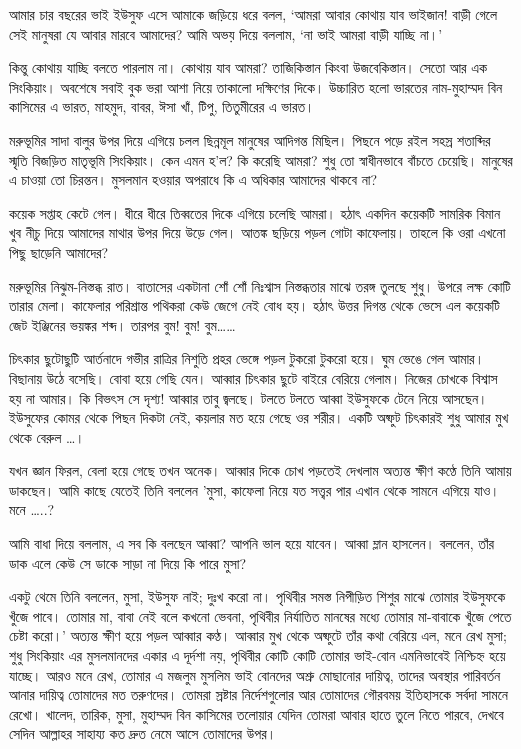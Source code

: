 \documentclass[
]{book}
\begin{document}
আমার চার বছরের ভাই ইউসুফ এসে আমাকে জড়িয়ে ধরে বলল, `আমরা আবার কোথায় যাব ভাইজান! বাড়ী গেলে সেই মানুষরা যে আবার মারবে আমাদের? আমি অভয় দিয়ে বললাম, `না ভাই আমরা বাড়ী যাচ্ছি না।'

কিন্তু কোথায় যাচ্ছি বলতে পারলাম না। কোথায় যাব আমরা? তাজিকিস্তান কিংবা উজবেকিস্তান। সেতো আর এক সিংকিয়াং। অবশেষে সবাই বুক ভরা আশা নিয়ে তাকালো দক্ষিণের দিকে। উচ্চারিত হলো ভারতের নাম-মুহাম্মদ বিন কাসিমের এ ভারত, মাহমুদ, বাবর, ঈসা খাঁ, টিপু, তিতুমীরের এ ভারত।

মরুভূমির সাদা বালুর উপর দিয়ে এগিয়ে চলল ছিন্নমূল মানুষের আদিগন্ত মিছিল। পিছনে পড়ে রইল সহস্র শতাব্দির স্মৃতি বিজড়িত মাতৃভূমি সিংকিয়াং। কেন এমন হ'ল? কি করেছি আমরা? শুধু তো স্বাধীনভাবে বাঁচতে চেয়েছি। মানুষের এ চাওয়া তো চিরন্তন। মুসলমান হওয়ার অপরাধে কি এ অধিকার আমাদের থাকবে না?

কয়েক সপ্তাহ কেটে গেল। ধীরে ধীরে তিব্বতের দিকে এগিয়ে চলেছি আমরা। হঠাৎ একদিন কয়েকটি সামরিক বিমান খুব নীচু দিয়ে আমাদের মাথার উপর দিয়ে উড়ে গেল। আতঙ্ক ছড়িয়ে পড়ল গোটা কাফেলায়। তাহলে কি ওরা এখনো পিছু ছাড়েনি আমাদের?

মরুভূমির নিঝুম-নিস্তব্ধ রাত। বাতাসের একটানা শোঁ শোঁ নিঃশ্বাস নিস্তব্ধতার মাঝে তরঙ্গ তুলছে শুধু। উপরে লক্ষ কোটি তারার মেলা। কাফেলার পরিশ্রান্ত পথিকরা কেউ জেগে নেই বোধ হয়। হঠাৎ উত্তর দিগন্ত থেকে ভেসে এল কয়েকটি জেট ইঞ্জিনের ভয়ঙ্কর শব্দ। তারপর বুম! বুম! বুম\ldots\ldots{}

চিৎকার ছুটোছুটি আর্তনাদে গভীর রাত্রির নিশুতি প্রহর ভেঙ্গে পড়ল টুকরো টুকরো হয়ে। ঘুম ভেঙে গেল আমার। বিছানায় উঠে বসেছি। বোবা হয়ে গেছি যেন। আব্বার চিৎকার ছুটে বাইরে বেরিয়ে গেলাম। নিজের চোখকে বিশ্বাস হয় না আমার। কি বিভৎস সে দৃশ্য! আব্বার তাবু জ্বলছে। টলতে টলতে আব্বা ইউসুফকে টেনে নিয়ে আসছেন। ইউসুফের কোমর থেকে পিছন দিকটা নেই, কয়লার মত হয়ে গেছে ওর শরীর। একটি অষ্ফুট চিৎকারই শুধু আমার মুখ থেকে বেরুল \ldots।

যখন জ্ঞান ফিরল, বেলা হয়ে গেছে তখন অনেক। আব্বার দিকে চোখ পড়তেই দেখলাম অত্যন্ত ক্ষীণ কণ্ঠে তিনি আমায় ডাকছেন। আমি কাছে যেতেই তিনি বললেন 'মুসা, কাফেলা নিয়ে যত সত্ত্বর পার এখান থেকে সামনে এগিয়ে যাও। মনে \ldots..?

আমি বাধা দিয়ে বললাম, এ সব কি বলছেন আব্বা? আপনি ভাল হয়ে যাবেন। আব্বা ম্লান হাসলেন। বললেন, তাঁর ডাক এলে কেউ সে ডাকে সাড়া না দিয়ে কি পারে মুসা?

একটু থেমে তিনি বললেন, মুসা, ইউসুফ নাই; দুঃখ করো না। পৃথিবীর সমস্ত নিপীড়িত শিশুর মাঝে তোমার ইউসুফকে খুঁজে পাবে। তোমার মা, বাবা নেই বলে কখনো ভেবনা, পৃথিবীর নির্যাতিত মানষের মধ্যে তোমার মা-বাবাকে খুঁজে পেতে চেষ্টা করো।' অত্যন্ত ক্ষীণ হয়ে পড়ল আব্বার কণ্ঠ। আব্বার মুখ থেকে অষ্ফুটে তাঁর কথা বেরিয়ে এল, মনে রেখ মুসা; শুধু সিংকিয়াং এর মুসলমানদের একার এ দূর্দশা নয়, পৃথিবীর কোটি কোটি তোমার ভাই-বোন এমনিভাবেই নিশ্চিহ্ন হয়ে যাচ্ছে। আরও মনে রেখ, তোমার এ মজলুম মুসলিম ভাই বোনদের অশ্রু মোছানোর দায়িত্ব, তাদের অবস্থার পারিবর্তন আনার দায়িত্ব তোমাদের মত তরুণদের। তোমরা স্রষ্টার নির্দেশগুলোর আর তোমাদের গৌরবময় ইতিহাসকে সর্বদা সামনে রেখো। খালেদ, তারিক, মুসা, মুহাম্মদ বিন কাসিমের তলোয়ার যেদিন তোমরা আবার হাতে তুলে নিতে পারবে, দেখবে সেদিন আল্লাহর সাহায্য কত দ্রুত নেমে আসে তোমাদের উপর।
\end{document}

